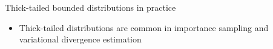 \documentclass[english,t]{beamer}
\begin{document}
\begin{frame}{Thick-tailed bounded distributions in practice}

  \begin{itemize}
  \item Thick-tailed distributions are common in importance sampling
    and variational divergence estimation
      \vspace{0.25\baselineskip}
  \end{itemize}

\end{frame}



  

\end{document}
